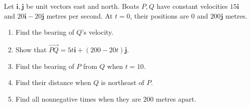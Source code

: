 Let $\mathbf i,\mathbf j$ be unit vectors east and north. Boats $P,Q$ have constant velocities $15\mathbf i$ and $20\mathbf i-20\mathbf j$ metres per second. At $t=0$, their positions are $0$ and $200\mathbf j$ metres.
\begin{enumerate}\item Find the bearing of $Q$'s velocity.
\item Show that $\overrightarrow{PQ}=5t\mathbf i+(200-20t)\mathbf j$.
\item Find the bearing of $P$ from $Q$ when $t=10$.
\item Find their distance when $Q$ is northeast of $P$.
\item Find all nonnegative times when they are $200$ metres apart.\end{enumerate}
